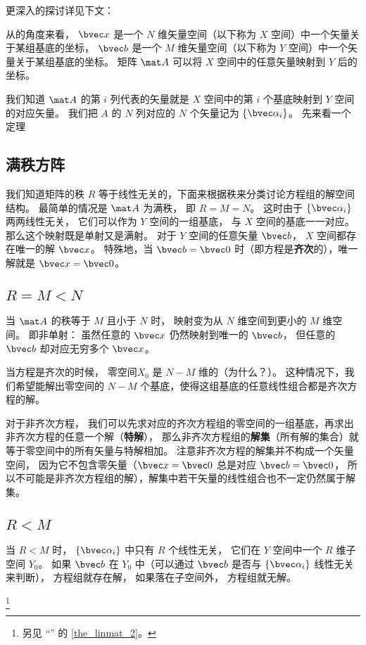 更深入的探讨详见下文：

从的角度来看， $\bvec x$ 是一个 $N$ 维矢量空间（以下称为 $X$ 空间）中一个矢量关于某组基底的坐标， $\bvec b$ 是一个 $M$ 维矢量空间（以下称为 $Y$ 空间）中一个矢量关于某组基底的坐标。 矩阵 $\mat A$ 可以将 $X$ 空间中的任意矢量映射到 $Y$ 后的坐标。

我们知道 $\mat A$ 的第 $i$ 列代表的矢量就是 $X$ 空间中的第 $i$ 个基底映射到 $Y$ 空间的对应矢量。 我们把 $A$ 的 $N$ 列对应的 $N$ 个矢量记为 $\{\bvec \alpha_i\}$。 先来看一个定理

\subsection{满秩方阵}
我们知道矩阵的秩 $R$ 等于线性无关的，下面来根据秩来分类讨论方程组的解空间结构。 最简单的情况是 $\mat A$ 为满秩， 即 $R = M = N$。 这时由于 $\{\bvec \alpha_i\}$ 两两线性无关， 它们可以作为 $Y$ 空间的一组基底， 与 $X$ 空间的基底一一对应。 那么这个映射既是单射又是满射。%
对于 $Y$ 空间的任意矢量 $\bvec b$， $X$ 空间都存在唯一的解 $\bvec x$。 特殊地，当 $\bvec b = \bvec 0$ 时（即方程是\textbf{齐次}的），唯一解就是 $\bvec x = \bvec 0$。

\subsection{$R = M < N$}\label{sub_LinEq_1}

当 $\mat A$ 的秩等于 $M$ 且小于 $N$ 时， 映射变为从 $N$ 维空间到更小的 $M$ 维空间。 即非单射： 虽然任意的 $\bvec x$ 仍然映射到唯一的 $\bvec b$， 但任意的 $\bvec b$ 却对应无穷多个 $\bvec x$。 


当方程是齐次的时候， 零空间$X_0$ 是 $N- M$ 维的（为什么？）。 这种情况下，我们希望能解出零空间的 $N - M$ 个基底，使得这组基底的任意线性组合都是齐次方程的解。

对于非齐次方程， 我们可以先求对应的齐次方程组的零空间的一组基底，再求出非齐次方程的任意一个解（\textbf{特解}）， 那么非齐次方程组的\textbf{解集}（所有解的集合）就等于零空间中的所有矢量与特解相加。 注意非齐次方程的解集并不构成一个矢量空间， 因为它不包含零矢量（$\bvec x = \bvec 0$ 总是对应 $\bvec b = \bvec 0$， 所以不可能是非齐次方程组的解），解集中若干矢量的线性组合也不一定仍然属于解集。

\subsection{$R < M$}
当 $R < M$ 时， $\{\bvec \alpha_i\}$ 中只有 $R$ 个线性无关， 它们在 $Y$ 空间中一个 $R$ 维子空间 $Y_0$。 如果 $\bvec b$ 在 $Y_0$ 中（可以通过 $\bvec b$ 是否与 $\{\bvec \alpha_i\}$ 线性无关来判断）， 方程组就存在解， 如果落在子空间外， 方程组就无解。

\footnote{另见 “” 的 \autoref{the_linmat_2}。}
